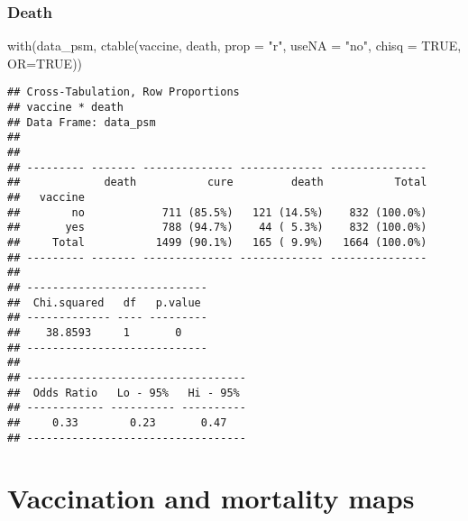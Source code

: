 \documentclass[
]{article}
\newenvironment{Shaded}{\begin{snugshade}}{\end{snugshade}}
\newcommand{\AttributeTok}[1]{\textcolor[rgb]{0.77,0.63,0.00}{#1}}
\newcommand{\ConstantTok}[1]{\textcolor[rgb]{0.00,0.00,0.00}{#1}}
\newcommand{\FunctionTok}[1]{\textcolor[rgb]{0.00,0.00,0.00}{#1}}
\newcommand{\NormalTok}[1]{#1}
\newcommand{\StringTok}[1]{\textcolor[rgb]{0.31,0.60,0.02}{#1}}
\begin{document}
\hypertarget{death-1}{%
\subsubsection{Death}\label{death-1}}

\begin{Shaded}
\begin{Highlighting}[]
\FunctionTok{with}\NormalTok{(data\_psm, }\FunctionTok{ctable}\NormalTok{(vaccine, death, }\AttributeTok{prop =} \StringTok{"r"}\NormalTok{, }\AttributeTok{useNA =} \StringTok{"no"}\NormalTok{, }\AttributeTok{chisq =} \ConstantTok{TRUE}\NormalTok{, }\AttributeTok{OR=}\ConstantTok{TRUE}\NormalTok{))}
\end{Highlighting}
\end{Shaded}

\begin{verbatim}
## Cross-Tabulation, Row Proportions  
## vaccine * death  
## Data Frame: data_psm  
## 
## 
## --------- ------- -------------- ------------- ---------------
##             death           cure         death           Total
##   vaccine                                                     
##        no            711 (85.5%)   121 (14.5%)    832 (100.0%)
##       yes            788 (94.7%)    44 ( 5.3%)    832 (100.0%)
##     Total           1499 (90.1%)   165 ( 9.9%)   1664 (100.0%)
## --------- ------- -------------- ------------- ---------------
## 
## ----------------------------
##  Chi.squared   df   p.value 
## ------------- ---- ---------
##    38.8593     1       0    
## ----------------------------
## 
## ----------------------------------
##  Odds Ratio   Lo - 95%   Hi - 95% 
## ------------ ---------- ----------
##     0.33        0.23       0.47   
## ----------------------------------
\end{verbatim}

\hypertarget{vaccination-and-mortality-maps}{%
\section{Vaccination and mortality
maps}\label{vaccination-and-mortality-maps}}
\end{document}
